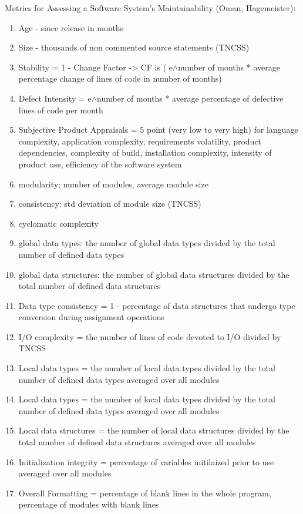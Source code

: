 \documentclass{article}
\begin{document}
Metrics for Assessing a Software System's Maintainability (Oman, Hagemeister):
\begin{enumerate}
\item Age - since release in months
\item Size - thousands of non commented source statements (TNCSS)
\item Stability = 1 - Change Factor -> CF is ( e$\land$number of months * average percentage change of lines of code in number of months)
\item Defect Intensity =  e$\land$number of months * average percentage of defective lines of code per month
\item Subjective Product Appraisals = 5 point (very low to very high) for language complexity, application complexity, requirements volatility, product dependencies, complexity of build, installation complexity, intensity of product use, efficiency of the software system
\item modularity: number of modules, average module size
\item consistency: std deviation of module size (TNCSS)
\item cyclomatic complexity
\item global data types: the number of global data types divided by the total number of defined data types
\item global data structures: the number of global data structures divided by the total number of defined data structures
\item Data type consistency = 1 - percentage of data structures that undergo type conversion during assignment operations
\item I/O complexity = the number of lines of code devoted to I/O divided by TNCSS
\item Local data types = the number of local data types divided by the total number of defined data types averaged over all modules
\item Local data types = the number of local data types divided by the total number of defined data types averaged over all modules
\item Local data structures = the number of local data structures divided by the total number of defined data structures averaged over all modules
\item Initialization integrity = percentage of variables initilaized prior to use averaged over all modules
\item Overall Formatting =  percentage of blank lines in the whole program, percentage of modules with blank lines

\end{enumerate}
\end{document}
